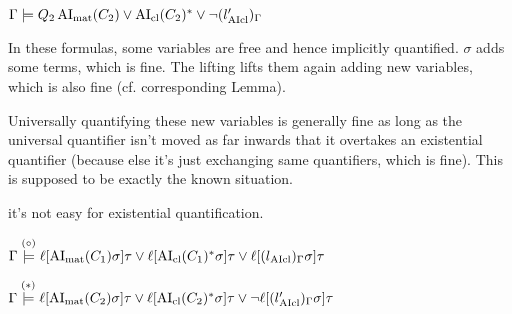 \documentclass[,%
	paper=a4,%
	DIV10, %
	twoside=false,%
	liststotoc,
	bibtotoc,
	draft=false,%
	numbers=noendperiod
]{scrartcl}
\begin{document}
$\Gamma \models Q_2 \operatorname{AI}_\mathrm{mat}(C_2) \lor \operatorname{AI}_\mathrm{cl}(C_2)^* \lor {\lnot (l{\ensuremath{_{\operatorname{AIcl}}}'})_\Gamma}$

In these formulas, some variables are free and hence implicitly quantified. 
$\sigma$ adds some terms, which is fine. The lifting lifts them again adding new variables, which is also fine (cf.{} corresponding Lemma).

Universally quantifying these new variables is generally fine as long as the universal quantifier isn't moved as far inwards that it overtakes an existential quantifier (because else it's just exchanging same quantifiers, which is fine).
This is supposed to be exactly the known situation. 

it's not easy for existential quantification.





			$\Gamma \stackrel{(\circ)}{\models} \ell[\operatorname{AI}_\mathrm{mat}(C_1)\sigma]\tau \lor \ell[\operatorname{AI}_\mathrm{cl}(C_1)^*\sigma]\tau \lor \ell[(l{_{\operatorname{AIcl}}})_\Gamma\sigma]\tau$

			$\Gamma \stackrel{(*)}{\models} \ell[\operatorname{AI}_\mathrm{mat}(C_2)\sigma]\tau \lor \ell[\operatorname{AI}_\mathrm{cl}(C_2)^*\sigma]\tau \lor \lnot \ell[(l{_{\operatorname{AIcl}}'})_\Gamma\sigma]\tau$
\end{document}
